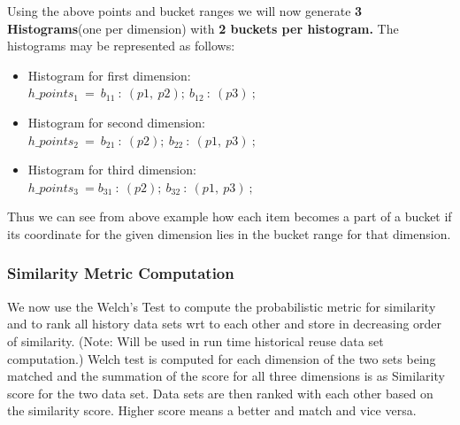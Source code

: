 \documentclass{vldb}
\begin{document}
Using the above points and bucket ranges we will now generate \textbf{3 Histograms}(one per dimension) with \textbf{2 buckets per histogram.} The histograms may be represented as follows: \\
\begin{itemize}
    \item Histogram for first dimension:\\
        $h\_points_1\ =\ {b_{11}\ :\  (p1,\  p2);\ b_{12}\ :\  (p3)\ };$
    
    \item Histogram for second dimension: \\
        $h\_points_2\ =\ {b_{21}\ :\  (p2);\ b_{22}\ :\  (p1, \ p3)\ };$
        
    \item Histogram for third dimension:\\
        $h\_points_3\ =  {b_{31}\ :\  (p2);\ b_{32}\ :\  (p1, \ p3)\ };$
\end{itemize}

Thus we can see from above example how each item becomes a part of a bucket if its coordinate for the given dimension lies in the bucket range for that dimension.

\subsubsection{Similarity Metric Computation}
\label{similarity_metric_calculation}
We now use the Welch's Test \cite{welch_test}\cite{boost_graph} to compute the probabilistic metric for similarity and to rank all history data sets wrt to each other and store in decreasing order of similarity. (Note: Will be used in run time historical reuse data set computation.) 
Welch test is computed for each dimension of the two sets being matched and the summation of the score for all three dimensions is as Similarity score for the two data set. Data sets are then ranked with each other based on the similarity score. Higher score means a better and match and vice versa.
\end{document}
